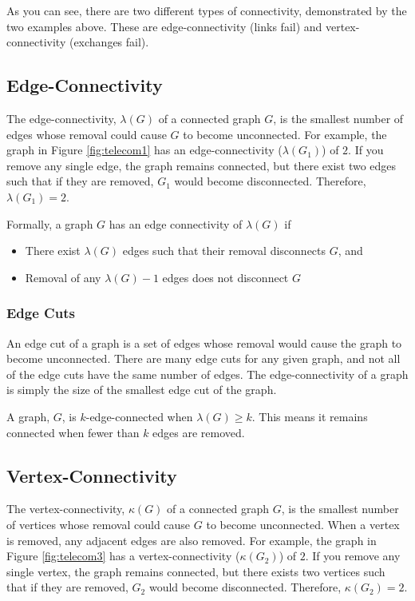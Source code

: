 As you can see, there are two different types of connectivity, demonstrated by the two examples above. These are
 edge-connectivity (links fail) and vertex-connectivity (exchanges fail).

\subsection*{Edge-Connectivity}

The edge-connectivity, $\lambda(G)$ of a
 connected graph $G$, is the smallest number of edges whose removal could cause $G$ to become unconnected. For example,
 the graph in Figure \ref*{fig:telecom1} has an edge-connectivity ($\lambda(G_1)$) of $2$. If you remove any single edge,
 the graph remains connected, but there exist two edges such that if they are removed, $G_1$ would become disconnected.
 Therefore, $\lambda(G_1) = 2$.

Formally, a graph $G$ has an edge connectivity of $\lambda(G)$ if
\begin{itemize}
  \item There exist $\lambda(G)$ edges such that their removal disconnects $G$, and
  \item Removal of any $\lambda(G) - 1$ edges does not disconnect $G$
\end{itemize}

\subsubsection*{Edge Cuts}

An edge cut of a graph is a set of edges whose removal would cause the graph to become unconnected. There are many edge
 cuts for any given graph, and not all of the edge cuts have the same number of edges. The edge-connectivity of a graph
 is simply the size of the smallest edge cut of the graph.

A graph, $G$, is $k$-edge-connected when $\lambda(G) \geq k$. This means it remains connected when fewer than $k$ edges
 are removed.

\subsection*{Vertex-Connectivity}

The vertex-connectivity, $\kappa(G)$ of a connected graph $G$, is the smallest number of vertices whose removal could
 cause $G$ to become unconnected. When a vertex is removed, any adjacent edges are also removed. For example, the graph
 in Figure \ref*{fig:telecom3} has a vertex-connectivity ($\kappa(G_2)$) of $2$. If you remove any single vertex, the
 graph remains connected, but there exists two vertices such that if they are removed, $G_2$ would become disconnected.
 Therefore, $\kappa(G_2) = 2$.

